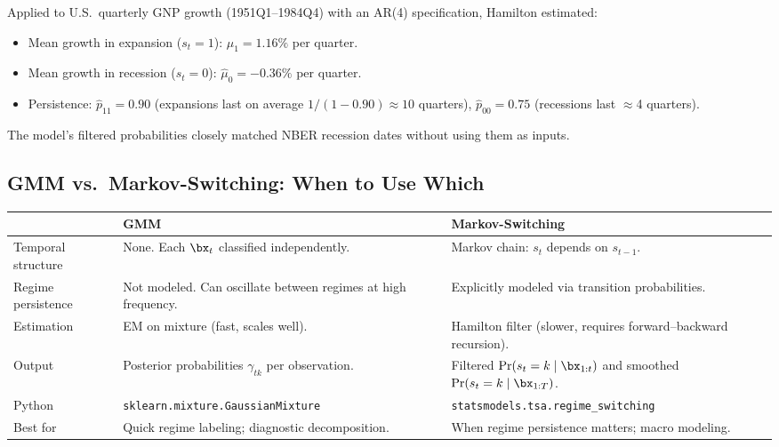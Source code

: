 \begin{keyresult}
Applied to U.S.\ quarterly GNP growth (1951Q1--1984Q4) with an AR(4)
specification, Hamilton estimated:
\begin{itemize}[leftmargin=1.5em]
  \item Mean growth in expansion ($s_t = 1$): $\hat{\mu}_1 = 1.16\%$
        per quarter.
  \item Mean growth in recession ($s_t = 0$): $\hat{\mu}_0 = -0.36\%$
        per quarter.
  \item Persistence: $\hat{p}_{11} = 0.90$ (expansions last on average
        $1/(1 - 0.90) \approx 10$ quarters),
        $\hat{p}_{00} = 0.75$ (recessions last $\approx$4 quarters).
\end{itemize}
The model's filtered probabilities closely matched NBER recession
dates without using them as inputs.
\end{keyresult}

\subsection{GMM vs.\ Markov-Switching: When to Use Which}
\label{sec:regimes:comparison}

\begin{center}
\begin{tabular}{p{3.5cm} p{5cm} p{5cm}}
  \toprule
  & \textbf{GMM} & \textbf{Markov-Switching} \\
  \midrule
  Temporal structure &
    None.  Each $\bx_t$ classified independently. &
    Markov chain: $s_t$ depends on $s_{t-1}$. \\[4pt]
  Regime persistence &
    Not modeled.  Can oscillate between regimes at high frequency. &
    Explicitly modeled via transition probabilities. \\[4pt]
  Estimation &
    EM on mixture (fast, scales well). &
    Hamilton filter (slower, requires forward--backward recursion). \\[4pt]
  Output &
    Posterior probabilities $\gamma_{tk}$ per observation. &
    Filtered $\Pr(s_t = k \mid \bx_{1:t})$ and smoothed
    $\Pr(s_t = k \mid \bx_{1:T})$. \\[4pt]
  Python &
    \texttt{sklearn.mixture.GaussianMixture} &
    \texttt{statsmodels.tsa.regime\_switching} \\[4pt]
  Best for &
    Quick regime labeling; diagnostic decomposition. &
    When regime persistence matters; macro modeling. \\
  \bottomrule
\end{tabular}
\end{center}


